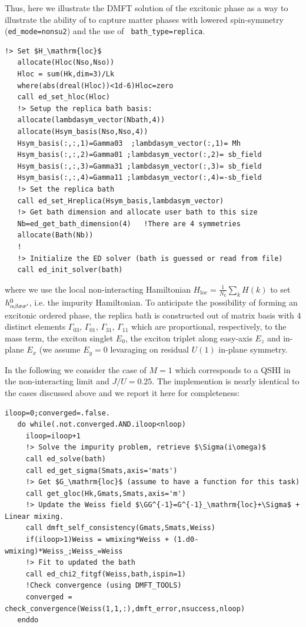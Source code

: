 \documentclass[edipack_sp.tex]{subfiles}
\begin{document}
Thus, here we illustrate the DMFT solution of the excitonic phase as a way to
illustrate the ability of \NAME to capture matter phases with lowered
spin-symmetry ({\tt ed\_mode=nonsu2}) and the use of {\tt
  bath\_type=replica}.
\begin{lstlisting}[style=fstyle,numbers=none,basicstyle={\scriptsize\ttfamily}]
   !> Set $H_\mathrm{loc}$
   allocate(Hloc(Nso,Nso))
   Hloc = sum(Hk,dim=3)/Lk
   where(abs(dreal(Hloc))<1d-6)Hloc=zero
   call ed_set_hloc(Hloc)
   !> Setup the replica bath basis:
   allocate(lambdasym_vector(Nbath,4))
   allocate(Hsym_basis(Nso,Nso,4))
   Hsym_basis(:,:,1)=Gamma03  ;lambdasym_vector(:,1)= Mh
   Hsym_basis(:,:,2)=Gamma01 ;lambdasym_vector(:,2)= sb_field
   Hsym_basis(:,:,3)=Gamma31 ;lambdasym_vector(:,3)= sb_field
   Hsym_basis(:,:,4)=Gamma11 ;lambdasym_vector(:,4)=-sb_field
   !> Set the replica bath
   call ed_set_Hreplica(Hsym_basis,lambdasym_vector)
   !> Get bath dimension and allocate user bath to this size
   Nb=ed_get_bath_dimension(4)   !There are 4 symmetries
   allocate(Bath(Nb))
   !
   !> Initialize the ED solver (bath is guessed or read from file) 
   call ed_init_solver(bath)
\end{lstlisting}
where we use the local non-interacting Hamiltonian 
$H_\mathrm{loc}=\tfrac{1}{N_k}\sum_k H(k)$ to set 
$h^0_{\alpha\beta\sigma\sigma'}$, i.e. the impurity Hamiltonian. To anticipate the
possibility of forming an excitonic ordered phase, the replica bath
is constructed out of matrix basis with 4 distinct elements
$\Gamma_{03}$, $\Gamma_{01}$, $\Gamma_{31}$, $\Gamma_{11}$ which
are proportional, respectively, to the mass term, the exciton singlet
$E_0$, the exciton triplet along easy-axis $E_z$ and in-plane
$E_x$ (we assume $E_y=0$ levaraging on residual $U(1)$ in-plane
symmetry. 




In the following we consider the case of $M=1$ which corresponds to a
QSHI in the non-interacting limit and $J/U=0.25$.
The implemention is nearly identical to the cases discussed above and
we report it here for completeness:
\begin{lstlisting}[style=fstyle,numbers=none,basicstyle={\scriptsize\ttfamily}]
   iloop=0;converged=.false.
   do while(.not.converged.AND.iloop<nloop)
     iloop=iloop+1
     !> Solve the impurity problem, retrieve $\Sigma(i\omega)$
     call ed_solve(bath)
     call ed_get_sigma(Smats,axis='mats')
     !> Get $G_\mathrm{loc}$ (assume to have a function for this task)
     call get_gloc(Hk,Gmats,Smats,axis='m')
     !> Update the Weiss field $\GG^{-1}=G^{-1}_\mathrm{loc}+\Sigma$ +  Linear mixing.
     call dmft_self_consistency(Gmats,Smats,Weiss)
     if(iloop>1)Weiss = wmixing*Weiss + (1.d0-wmixing)*Weiss_;Weiss_=Weiss
     !> Fit to updated the bath
     call ed_chi2_fitgf(Weiss,bath,ispin=1)
     !Check convergence (using DMFT_TOOLS)
     converged = check_convergence(Weiss(1,1,:),dmft_error,nsuccess,nloop)
   enddo  
\end{lstlisting}
\end{document}
